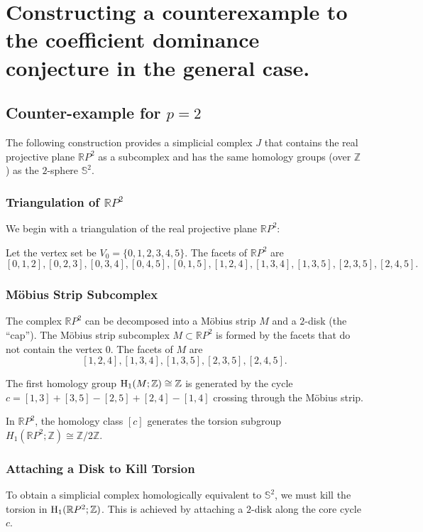 \documentclass[11pt]{amsart}
\theoremstyle{theorem}
\theoremstyle{remark}
\theoremstyle{definition}
\newcommand{\HH}  {\mbox{\rm H}}
\begin{document}
\section{Constructing a counterexample to the coefficient dominance conjecture in the general case.}
\label{sec:counterexample}
\subsection{Counter-example for $p=2$}
\label{subsec:counter:2}
The following construction provides a simplicial complex $J$ that contains the real projective plane $\mathbb{R}P^2$ as a subcomplex and 
has the same homology groups (over $\mathbb{Z}$) as the $2$-sphere $\mathbb{S}^2$.

\subsubsection{Triangulation of $\mathbb{R}P^2$}
We begin with a triangulation of the real projective plane $\mathbb{R}P^2$:

Let the vertex set be $V_0 = \{0, 1, 2, 3, 4, 5\}$.
The facets of $\mathbb{R}P^2$ are
   \[
   [0, 1, 2], [0, 2, 3], [0, 3, 4], [0, 4, 5], [0, 1, 5], [1, 2, 4], [1, 3, 4], [1, 3, 5], [2, 3, 5], [2, 4, 5].
   \]


\subsubsection{Möbius Strip Subcomplex}


The complex $\mathbb{R}P^2$ can be decomposed into a Möbius strip $M$ and a 
$2$-disk (the ``cap''). The Möbius strip subcomplex $M \subset \mathbb{R}P^2$ is formed by the facets that do not contain the vertex $0$. The facets of $M$ are
    $$[1, 2, 4], [1, 3, 4], [1, 3, 5], [2, 3, 5], [2, 4, 5].$$


The first homology group $\HH_1(M;\mathbb{Z}) \cong \mathbb{Z}$ is generated by the cycle $c = [1,3] + [3,5] - [2,5] + [2,4] - [1,4]$ crossing through the Möbius strip. 


In $\mathbb{R}P^2$, the homology class $[c]$ generates the torsion subgroup $H_1(\mathbb{R}P^2;\mathbb{Z}) \cong \mathbb{Z}/2\mathbb{Z}$.

\subsubsection{Attaching a Disk to Kill Torsion}
To obtain a simplicial complex homologically equivalent to $\mathbb{S}^2$, we must kill the torsion in $\HH_1(\mathbb{R}P^2;\mathbb{Z})$. This is achieved by attaching a $2$-disk along the core cycle $c$.
\end{document}
